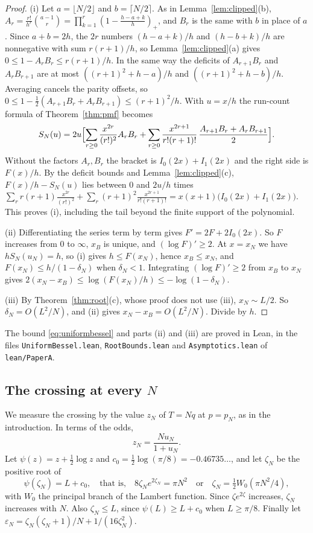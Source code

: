 \begin{proof}
(i) Let $a=\lfloor N/2\rfloor$ and $b=\lceil N/2\rceil$. As in Lemma~\ref{lem:clipped}(b),
$A_r=\frac{r!}{h^r}\binom{a-1}{r}=\prod_{k=1}^r(1-\frac{h-a+k}h)_+$, and $B_r$ is the same with $b$
in place of $a$. Since $a+b=2h$, the $2r$ numbers $(h-a+k)/h$ and $(h-b+k)/h$ are
nonnegative with sum $r(r+1)/h$, so Lemma~\ref{lem:clipped}(a) gives $0\le1-A_rB_r\le r(r+1)/h$.
In the same way the deficits of $A_{r+1}B_r$ and $A_rB_{r+1}$ are at most $((r+1)^2+h-a)/h$ and
$((r+1)^2+h-b)/h$. Averaging cancels the parity offsets, so
$0\le1-\frac12(A_{r+1}B_r+A_rB_{r+1})\le(r+1)^2/h$. With $u=x/h$ the run-count formula of
Theorem~\ref{thm:pmf} becomes
\[
S_N(u)=2u\Bigl[\sum_{r\ge0}\frac{x^{2r}}{(r!)^2}A_rB_r
+\sum_{r\ge0}\frac{x^{2r+1}}{r!(r+1)!}\,\frac{A_{r+1}B_r+A_rB_{r+1}}2\Bigr].
\]
Without the factors $A_r,B_r$ the bracket is $I_0(2x)+I_1(2x)$ and the right side is $F(x)/h$. By
the deficit bounds and Lemma~\ref{lem:clipped}(c), $F(x)/h-S_N(u)$ lies between $0$ and $2u/h$
times
$\sum_rr(r+1)\frac{x^{2r}}{(r!)^2}+\sum_r(r+1)^2\frac{x^{2r+1}}{r!(r+1)!}=x(x+1)\bigl(I_0(2x)+I_1(2x)\bigr)$.
This proves (i), including the tail beyond the finite support of the polynomial.

(ii) Differentiating the series term by term gives $F'=2F+2I_0(2x)$. So $F$ increases from $0$ to
$\infty$, $x_B$ is unique, and $(\log F)'\ge2$. At $x=x_N$ we have $hS_N(u_N)=h$, so (i) gives
$h\le F(x_N)$, hence $x_B\le x_N$, and $F(x_N)\le h/(1-\delta_N)$ when $\delta_N<1$. Integrating
$(\log F)'\ge2$ from $x_B$ to $x_N$ gives $2(x_N-x_B)\le\log(F(x_N)/h)\le-\log(1-\delta_N)$.

(iii) By Theorem~\ref{thm:root}(c), whose proof does not use (iii), $x_N\sim L/2$. So
$\delta_N=O(L^2/N)$, and (ii) gives $x_N-x_B=O(L^2/N)$. Divide by $h$.
\end{proof}

The bound \eqref{eq:uniformbessel} and parts (ii) and (iii) are proved in Lean, in the files
\texttt{UniformBessel.lean}, \texttt{RootBounds.lean} and \texttt{Asymptotics.lean} of
\texttt{lean/PaperA}.

\subsection{The crossing at every \texorpdfstring{$N$}{N}}

We measure the crossing by the value $z_N$ of $T=Nq$ at $p=p_N$, as in the introduction. In terms
of the odds,
\begin{equation}\label{eq:zN}
z_N=\frac{Nu_N}{1+u_N}.
\end{equation}
Let
$\psi(z)=z+\frac12\log z$ and $c_0=\frac12\log(\pi/8)=-0.46735\ldots$, and let $\zeta_N$ be the
positive root of
\begin{equation}\label{eq:zetaN}
\psi(\zeta_N)=L+c_0,\quad\text{that is,}\quad 8\zeta_Ne^{2\zeta_N}=\pi N^2
\quad\text{or}\quad\zeta_N=\tfrac12W_0(\pi N^2/4),
\end{equation}
with $W_0$ the principal branch of the Lambert function. Since $\zeta e^{2\zeta}$ increases,
$\zeta_N$ increases with $N$. Also $\zeta_N\le L$, since $\psi(L)\ge L+c_0$ when $L\ge\pi/8$.
Finally let $\varepsilon_N=\zeta_N(\zeta_N+1)/N+1/(16\zeta_N^2)$.

